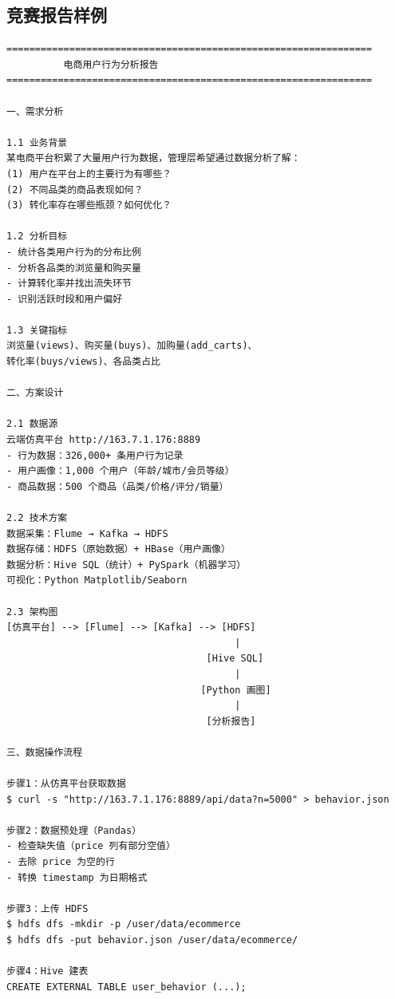 \documentclass[12pt,a4paper]{article}
\begin{document}
\subsection{竞赛报告样例}

\begin{knowledgebox}
{\footnotesize
\begin{verbatim}
================================================================
          电商用户行为分析报告
================================================================

一、需求分析

1.1 业务背景
某电商平台积累了大量用户行为数据，管理层希望通过数据分析了解：
(1) 用户在平台上的主要行为有哪些？
(2) 不同品类的商品表现如何？
(3) 转化率存在哪些瓶颈？如何优化？

1.2 分析目标
- 统计各类用户行为的分布比例
- 分析各品类的浏览量和购买量
- 计算转化率并找出流失环节
- 识别活跃时段和用户偏好

1.3 关键指标
浏览量(views)、购买量(buys)、加购量(add_carts)、
转化率(buys/views)、各品类占比

二、方案设计

2.1 数据源
云端仿真平台 http://163.7.1.176:8889
- 行为数据：326,000+ 条用户行为记录
- 用户画像：1,000 个用户（年龄/城市/会员等级）
- 商品数据：500 个商品（品类/价格/评分/销量）

2.2 技术方案
数据采集：Flume → Kafka → HDFS
数据存储：HDFS（原始数据）+ HBase（用户画像）
数据分析：Hive SQL（统计）+ PySpark（机器学习）
可视化：Python Matplotlib/Seaborn

2.3 架构图
[仿真平台] --> [Flume] --> [Kafka] --> [HDFS]
                                        |
                                   [Hive SQL]
                                        |
                                  [Python 画图]
                                        |
                                   [分析报告]

三、数据操作流程

步骤1：从仿真平台获取数据
$ curl -s "http://163.7.1.176:8889/api/data?n=5000" > behavior.json

步骤2：数据预处理（Pandas）
- 检查缺失值（price 列有部分空值）
- 去除 price 为空的行
- 转换 timestamp 为日期格式

步骤3：上传 HDFS
$ hdfs dfs -mkdir -p /user/data/ecommerce
$ hdfs dfs -put behavior.json /user/data/ecommerce/

步骤4：Hive 建表
CREATE EXTERNAL TABLE user_behavior (...);


\end{verbatim}}
\end{knowledgebox}
\end{document}
